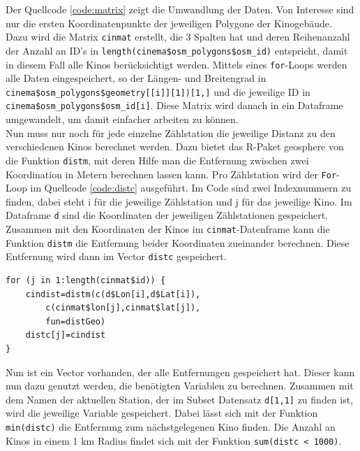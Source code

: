 \documentclass[a4paper,12pt]{thesis}
\begin{document}
Der Quellcode \ref{code:matrix} zeigt die Umwandlung der Daten. Von Interesse sind nur die ersten Koordinatenpunkte der jeweiligen Polygone der Kinogebäude. Dazu wird die Matrix \glqq{}\lstinline|cinmat|\grqq{} erstellt, die 3 Spalten hat und deren Reihenanzahl der Anzahl an ID's in \lstinline|length(cinema$osm_polygons$osm_id)| entspricht, damit in diesem Fall alle Kinos berücksichtigt werden. Mittels eines \lstinline|for|-Loops werden alle Daten eingespeichert, so der Längen- und Breitengrad in \lstinline|cinema$osm_polygons$geometry[[i]][1])[1,]| und die jeweilige ID in \lstinline|cinema$osm_polygons$osm_id[i]|. Diese Matrix wird danach in ein Dataframe umgewandelt, um damit einfacher arbeiten zu können.\\

Nun muss nur noch für jede einzelne Zählstation die jeweilige Distanz zu den verschiedenen Kinos berechnet werden. Dazu bietet das R-Paket \glqq{}geosphere\grqq{} von \cite{Hijmans2021} die Funktion \lstinline|distm|, mit deren Hilfe man die Entfernung zwischen zwei Koordination in Metern berechnen lassen kann. Pro Zählstation wird der \lstinline|For|-Loop im Quellcode \ref{code:distc} ausgeführt. Im Code sind zwei Indexnummern zu finden, dabei steht i für die jeweilige Zählstation und j für das jeweilige Kino. Im Dataframe \lstinline|d| sind die Koordinaten der jeweiligen Zählstationen gespeichert. Zusammen mit den Koordinaten der Kinos im \lstinline|cinmat|-Datenframe kann die Funktion \lstinline|distm| die Entfernung beider Koordinaten zueinander berechnen. Diese Entfernung wird dann im Vector \lstinline|distc| gespeichert.

\begin{minipage}{\linewidth}
\begin{lstlisting}[caption={Berechnung der Entfernung},label=code:distc]
for (j in 1:length(cinmat$id)) {
	cindist=distm(c(d$Lon[i],d$Lat[i]),
		c(cinmat$lon[j],cinmat$lat[j]), 
		fun=distGeo)
	distc[j]=cindist
}
\end{lstlisting}
\end{minipage}

Nun ist ein Vector vorhanden, der alle Entfernungen gespeichert hat. Dieser kann nun dazu genutzt werden, die benötigten Variablen zu berechnen. Zusammen mit dem Namen der aktuellen Station, der im Subset Datensatz \lstinline|d[1,1]| zu finden ist, wird die jeweilige Variable gespeichert. Dabei lässt sich mit der Funktion \lstinline|min(distc)| die Entfernung zum nächstgelegenen Kino finden. Die Anzahl an Kinos in einem 1 km Radius findet sich mit der Funktion \lstinline|sum(distc < 1000)|.
\end{document}
